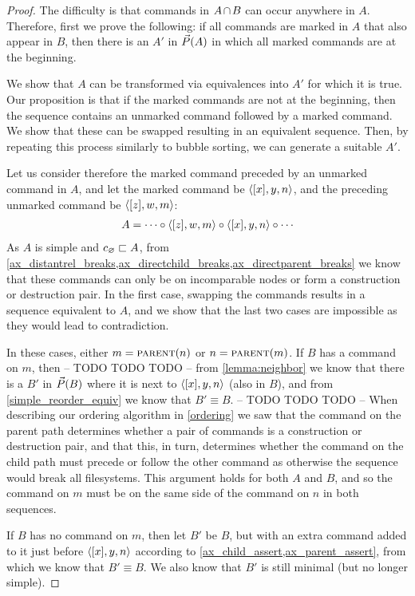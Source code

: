\begin{proof}
The difficulty is that commands in $\acbnp$ can occur anywhere in $A$.
Therefore, first we prove the following:
if all commands are marked in $A$ that also appear in $B$,
then there is an $A'$ in $\vec{P}({A})$ in which all marked commands are at the beginning.

We show that $A$ can be transformed via equivalences into $A'$ for which it is true.
Our proposition is that if the marked commands are not at the beginning, then
the sequence contains an unmarked command followed by a marked command.
We show that these can be swapped resulting in an equivalent sequence.
Then, by repeating this process similarly to bubble sorting, we can generate 
a suitable $A'$.

Let us consider therefore the marked command preceded by an unmarked command in $A$,
and let the marked command be $\langle{[x],y,n}\rangle$, 
and the preceding unmarked command be $\langle{[z],w,m}\rangle$:
\begin{gather*}
A = \cdots\circ  \langle{[z],w,m}\rangle\circ  \langle{[x],y,n}\rangle\circ  \cdots
\end{gather*}
As $A$ is simple and $c_\varnothing\sqsubset{A}$, from 
\cref{ax_distantrel_breaks,ax_directchild_breaks,ax_directparent_breaks}
we know that these commands can only be on incomparable nodes or form a construction or destruction pair.
In the first case, swapping the commands results in a sequence equivalent to $A$,
and we show that the last two cases are impossible as they would lead to contradiction.

In these cases, either $m=\text{\normalfont\scshape{parent}}(n)$ or $n=\text{\normalfont\scshape{parent}}(m)$.
If $B$ has a command on $m$, then
-- TODO TODO TODO --
from \cref{lemma:neighbor}
we know that there is a $B'$ in $\vec{P}({B})$ where it is next to $\langle{[x],y,n}\rangle$ (also in $B$),
and from \cref{simple_reorder_equiv} we know that $B'\equiv B$.
-- TODO TODO TODO --
When describing our ordering algorithm in \cref{ordering} we saw
that the command on the parent path determines whether a pair of commands
is a construction or destruction pair,
and that this, in turn, determines whether the command on the child path must
precede or follow the other command as otherwise the sequence would break all filesystems.
This argument holds for both $A$ and $B$, and so the command on $m$ must be on
the same side of the command on $n$ in both sequences.

If $B$ has no command on $m$, then let $B'$ be $B$, 
but with an extra command added to it just before $\langle{[x],y,n}\rangle$
according to \cref{ax_child_assert,ax_parent_assert}, 
from which we know that $B'\equiv B$.
We also know that $B'$ is still minimal (but no longer simple).


\end{proof}
